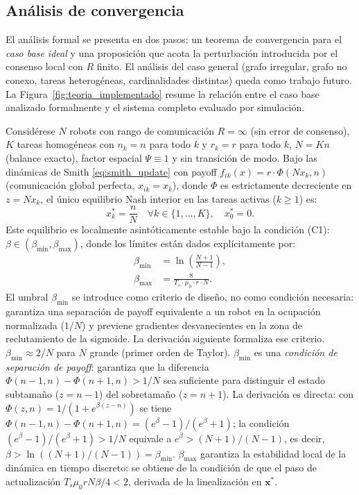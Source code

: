\subsection{Análisis de convergencia}

El análisis formal se presenta en dos pasos: un teorema de convergencia para el
\emph{caso base ideal} y una proposición que acota la perturbación introducida por
el consenso local con $R$ finito. El análisis del caso general (grafo irregular, grafo no conexo,
tareas heterogéneas, cardinalidades distintas) queda como trabajo futuro. La
Figura~\ref{fig:teoria_implementado} resume la relación entre el caso base analizado
formalmente y el sistema completo evaluado por simulación.



\begin{teorema}
\label{prop:convergencia}
Considérese $N$ robots con rango de comunicación $R = \infty$ (sin error de
consenso), $K$ tareas homogéneas con $n_k = n$ para todo $k$ y $r_k = r$ para
todo $k$, $N = Kn$ (balance exacto), factor espacial $\Psi \equiv 1$ y sin
transición de modo. Bajo las dinámicas de Smith \eqref{eq:smith_update} con payoff
$f_{ik}(x) = r \cdot \Phi(Nx_k, n)$ (comunicación global perfecta, $\hat{x}_{ik} = x_k$),
donde $\Phi$ es estrictamente decreciente en $z = Nx_k$, el único
equilibrio Nash interior en las tareas activas ($k \geq 1$) es:
\[
  x_k^* = \frac{n}{N} \quad \forall k \in \{1, \ldots, K\},
  \quad x_0^* = 0.
\]
Este equilibrio es localmente asintóticamente estable bajo la condición
\textup{(C1)}: $\beta \in (\beta_{\min}, \beta_{\max})$, donde los límites
están dados explícitamente por:
\begin{align}
  \beta_{\min} &= \ln\!\left(\frac{N+1}{N-1}\right),
    \label{eq:betamin}\\
  \beta_{\max} &= \frac{8}{T_s \cdot \mu_0 \cdot r \cdot N}.
    \label{eq:betamax}
\end{align}
El umbral $\beta_{\min}$ se introduce como criterio de diseño, no como condición
necesaria: garantiza una separación de payoff equivalente a un robot en la ocupación
normalizada ($1/N$) y previene gradientes desvanecientes en la zona de reclutamiento
de la sigmoide. La derivación siguiente formaliza ese criterio.
$\beta_{\min} \approx 2/N$ para $N$ grande (primer orden de Taylor).
$\beta_{\min}$ es una \emph{condición de separación de payoff}: garantiza que la diferencia $\Phi(n{-}1,n) - \Phi(n{+}1,n) > 1/N$ sea suficiente para distinguir el estado subtamaño ($z = n{-}1$)
del sobretamaño ($z = n{+}1$). La derivación es directa: con
$\Phi(z,n) = 1/(1+e^{\beta(z-n)})$ se tiene
$\Phi(n{-}1,n) - \Phi(n{+}1,n) = (e^\beta - 1)/(e^\beta + 1)$;
la condición $(e^\beta-1)/(e^\beta+1) > 1/N$ equivale a $e^\beta > (N{+}1)/(N{-}1)$,
es decir, $\beta > \ln\!\left((N{+}1)/(N{-}1)\right) = \beta_{\min}$.
$\beta_{\max}$ garantiza la estabilidad local de la dinámica en tiempo discreto:
se obtiene de la condición de que el paso de actualización
$T_s\mu_0 r N \beta/4 < 2$, derivada de la linealización en $\mathbf{x}^*$.
\end{teorema}

